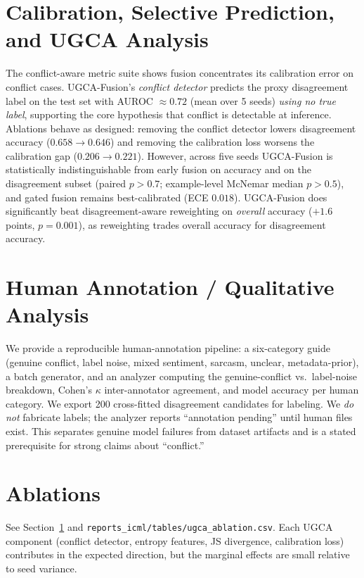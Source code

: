 \documentclass[11pt]{article}
\begin{document}
\section{Calibration, Selective Prediction, and UGCA Analysis}\label{sec:calib}
The conflict-aware metric suite shows fusion concentrates its calibration error
on conflict cases. UGCA-Fusion's \emph{conflict detector} predicts the proxy
disagreement label on the test set with AUROC ${\approx}0.72$ (mean over 5 seeds)
\emph{using no true label}, supporting the core hypothesis that conflict is
detectable at inference. Ablations behave as designed: removing the conflict
detector lowers disagreement accuracy ($0.658{\to}0.646$) and removing the
calibration loss worsens the calibration gap ($0.206{\to}0.221$). However,
across five seeds UGCA-Fusion is statistically indistinguishable from early
fusion on accuracy and on the disagreement subset (paired $p{>}0.7$;
example-level McNemar median $p{>}0.5$), and gated fusion remains best-calibrated
(ECE $0.018$). UGCA-Fusion does significantly beat disagreement-aware reweighting
on \emph{overall} accuracy ($+1.6$ points, $p{=}0.001$), as reweighting trades
overall accuracy for disagreement accuracy.

\section{Human Annotation / Qualitative Analysis}\label{sec:human}
We provide a reproducible human-annotation pipeline: a six-category guide
(genuine conflict, label noise, mixed sentiment, sarcasm, unclear,
metadata-prior), a batch generator, and an analyzer computing the
genuine-conflict vs.\ label-noise breakdown, Cohen's $\kappa$ inter-annotator
agreement, and model accuracy per human category. We export 200 cross-fitted
disagreement candidates for labeling. We \emph{do not} fabricate labels; the
analyzer reports ``annotation pending'' until human files exist. This separates
genuine model failures from dataset artifacts and is a stated prerequisite for
strong claims about ``conflict.''

\section{Ablations}\label{sec:abl}
See Section~\ref{sec:calib} and \texttt{reports\_icml/tables/ugca\_ablation.csv}.
Each UGCA component (conflict detector, entropy features, JS divergence,
calibration loss) contributes in the expected direction, but the marginal effects
are small relative to seed variance.
\end{document}
